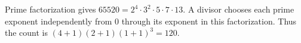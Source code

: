 Prime factorization gives $65520=2^4\cdot3^2\cdot5\cdot7\cdot13$. A divisor chooses each prime exponent independently from $0$ through its exponent in this factorization. Thus the count is $(4+1)(2+1)(1+1)^3=\boxed{120}$.
